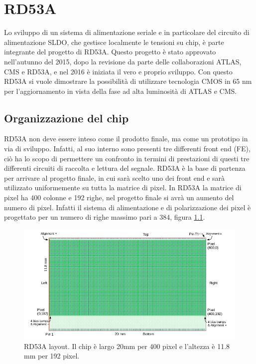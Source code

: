 \chapter{RD53A}

Lo sviluppo di un sistema di alimentazione seriale e in particolare del circuito di alimentazione SLDO, che gestisce localmente le tensioni su chip, è parte integrante del progetto di RD53A\cite{RD53A}.
Questo progetto è stato approvato nell'autunno del 2015, dopo la revisione da parte delle collaborazioni ATLAS, CMS e RD53A, e nel 2016 è iniziata il vero e proprio sviluppo. 
Con questo RD53A si vuole dimostrare la possibilità di utilizzare tecnologia CMOS  in 65 nm per l'aggiornamento in vista della fase ad alta luminosità di ATLAS e CMS. 

\section{Organizzazione del chip} 
RD53A non deve essere inteso come il prodotto finale, ma come un prototipo in via di sviluppo. Infatti, al suo interno sono presenti tre differenti front end (FE), ciò ha lo scopo di permettere un confronto in termini di prestazioni di questi tre differenti circuiti di raccolta e lettura del segnale. 
RD53A è la base di partenza per arrivare al progetto finale, in cui sarà scelto uno dei front end e sarà utilizzato uniformemente su tutta la matrice di pixel. In RD53A la matrice di pixel ha 400 colonne e 192 righe, nel progetto finale si avrà un aumento del numero di pixel. 
Infatti il sistema di alimentazione e di polarizzazione dei pixel è progettato per un numero di righe massimo pari a 384, figura \ref{RD53ALayout}.%
\begin{figure}
\centering
\includegraphics[scale=.4]{Immagini/RD53ALayout}
\caption{RD53A layout. Il chip è largo 20mm per 400 pixel e l'altezza è 11.8 mm per 192 pixel.}
\label{RD53ALayout}
\end{figure}

